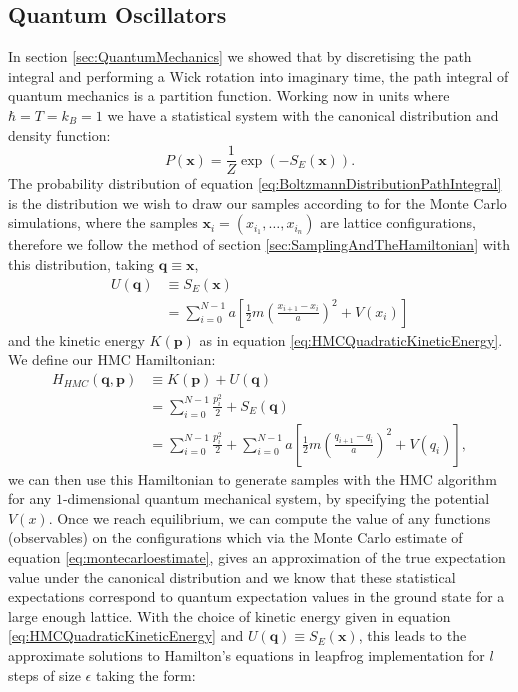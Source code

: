 \documentclass[12pt]{article}
\begin{document}
    \subsection{Quantum Oscillators}
    In section \ref{sec:QuantumMechanics} we showed that by discretising the path integral and performing a Wick rotation into imaginary time, the path integral of quantum mechanics is a partition function. Working now in units where $\hbar=T=k_B=1$ we have a statistical system with the canonical distribution and density function:
    \begin{equation}
        \label{eq:BoltzmannDistributionPathIntegral}
        P\left(\bm{x}\right) = \frac{1}{Z}\exp{\left(-S_E\left(\bm{x}\right)\right)}.
    \end{equation}
    The probability distribution of equation \ref{eq:BoltzmannDistributionPathIntegral} is the distribution we wish to draw our samples according to for the Monte Carlo simulations, where the samples $\bm{x}_i=\left(x_{i_{1}},\dots,x_{i_{n}}\right)$ are lattice configurations, therefore we follow the method of section \ref{sec:SamplingAndTheHamiltonian} with this distribution, taking $\bm{q}\equiv\bm{x}$,
    \begin{align}
        \label{eq:QuantumHMCPotential}
        U\left(\bm{q}\right) & \equiv S_E\left(\bm{x}\right) \\
                             & = \sum_{i=0}^{N-1} a \left[\frac{1}{2}m\left(\frac{x_{i+1}-x_{i}}{a}\right)^2 + V(x_i)\right]
    \end{align} 
    and the kinetic energy $K\left(\bm{p}\right)$ as in equation \ref{eq:HMCQuadraticKineticEnergy}. We define our HMC Hamiltonian:
    \begin{align}
        \label{eq:HMCQuantumMechanicalHamiltonian1}
        H_{HMC}\left(\bm{q},\bm{p}\right) & \equiv K\left(\bm{p}\right) + U\left(\bm{q}\right)\\
        \label{eq:HMCQuantumMechanicalHamiltonian2} & = \sum_{i=0}^{N-1} \frac{p_i^2}{2} + S_E\left(\bm{q}\right) \\
        \label{eq:HMCQuantumMechanicalHamiltonian3}& = \sum_{i=0}^{N-1} \frac{p_i^2}{2} + \sum_{i=0}^{N-1} a \left[\frac{1}{2}m\left(\frac{q_{i+1}-q_{i}}{a}\right)^2 + V\left(q_i\right)\right],
    \end{align} 
    we can then use this Hamiltonian to generate samples with the HMC algorithm for any $1$-dimensional quantum mechanical system, by specifying the potential $V\left(x\right)$. Once we reach equilibrium, we can compute the value of any functions (observables) on the configurations which via the Monte Carlo estimate of equation \ref{eq:montecarloestimate}, gives an approximation of the true expectation value under the canonical distribution and we know that these statistical expectations correspond to quantum expectation values in the ground state for a large enough lattice.  With the choice of kinetic energy given in equation \ref{eq:HMCQuadraticKineticEnergy} and $U\left(\bm{q}\right) \equiv S_E\left(\bm{x}\right)$, this leads to the approximate solutions to Hamilton's equations in leapfrog implementation for $l$ steps of size $\epsilon$ taking the form:
\end{document}
